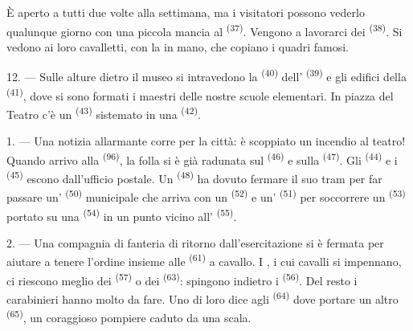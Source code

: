 È aperto a tutti due volte alla settimana, ma i visitatori possono vederlo qualunque
giorno con una piccola mancia al  \textsuperscript{(37)}. Vengono a
lavorarci dei  \textsuperscript{(38)}. Si vedono  ai
loro cavalletti, con la  in mano, che copiano i quadri famosi.

12. --- Sulle alture dietro il museo si intravedono la 
\textsuperscript{(40)} dell' \textsuperscript{(39)} e gli edifici
della  \textsuperscript{(41)}, dove si sono formati i maestri
delle nostre scuole elementari. In piazza del Teatro c'è un 
\textsuperscript{(43)} sistemato in una  \textsuperscript{(42)}.

\VUsaut{5.0mm}
\VUsaut{3.0mm}

\VUsaut{3.4mm}

1. --- Una notizia allarmante corre per la città: è scoppiato un incendio al teatro!
Quando arrivo alla  \textsuperscript{(96)}, la folla si è già radunata
sul  \textsuperscript{(46)} e sulla 
\textsuperscript{(47)}. Gli  \textsuperscript{(44)} e i
 \textsuperscript{(45)} escono dall'ufficio postale. Un
 \textsuperscript{(48)} ha dovuto fermare il suo tram per far passare
un' \textsuperscript{(50)} municipale che arriva con un
 \textsuperscript{(52)} e un'
\textsuperscript{(51)} per soccorrere un  \textsuperscript{(53)}
portato su una  \textsuperscript{(54)} in un punto vicino
all' \textsuperscript{(55)}.

2. --- Una compagnia di fanteria di ritorno dall'esercitazione si è fermata per aiutare
a tenere l'ordine insieme alle  \textsuperscript{(61)} a
cavallo. I , i cui cavalli si impennano, ci riescono meglio dei
 \textsuperscript{(57)} o dei 
\textsuperscript{(63)}: spingono indietro i  \textsuperscript{(56)}. Del
resto i carabinieri hanno molto da fare. Uno di loro dice agli 
\textsuperscript{(64)} dove portare un altro  \textsuperscript{(65)}, un
coraggioso pompiere caduto da una scala.


